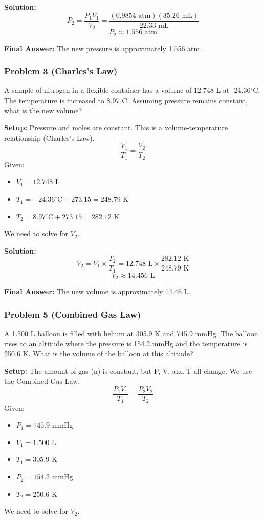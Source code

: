 \documentclass{article}
\begin{document}
\textbf{Solution:}
\[ P_2 = \frac{P_1V_1}{V_2} = \frac{(0.9854 \text{ atm})(35.26 \text{ mL})}{22.33 \text{ mL}} \]
\[ P_2 \approx 1.556 \text{ atm} \]

\textbf{Final Answer:} The new pressure is approximately 1.556 atm.

\subsubsection{Problem 3 (Charles's Law)}
A sample of nitrogen in a flexible container has a volume of 12.748 L at -24.36$^{\circ}$C. The temperature is increased to 8.97$^{\circ}$C. Assuming pressure remains constant, what is the new volume?

\textbf{Setup:}
Pressure and moles are constant. This is a volume-temperature relationship (Charles's Law).
\[ \frac{V_1}{T_1} = \frac{V_2}{T_2} \]
Given:
\begin{itemize}
    \item $V_1 = 12.748$ L
    \item $T_1 = -24.36^{\circ}\text{C} + 273.15 = 248.79$ K
    \item $T_2 = 8.97^{\circ}\text{C} + 273.15 = 282.12$ K
\end{itemize}
We need to solve for $V_2$.

\textbf{Solution:}
\[ V_2 = V_1 \times \frac{T_2}{T_1} = 12.748 \text{ L} \times \frac{282.12 \text{ K}}{248.79 \text{ K}} \]
\[ V_2 \approx 14.456 \text{ L} \]

\textbf{Final Answer:} The new volume is approximately 14.46 L.

\subsubsection{Problem 5 (Combined Gas Law)}
A 1.500 L balloon is filled with helium at 305.9 K and 745.9 mmHg. The balloon rises to an altitude where the pressure is 154.2 mmHg and the temperature is 250.6 K. What is the volume of the balloon at this altitude?

\textbf{Setup:}
The amount of gas (n) is constant, but P, V, and T all change. We use the Combined Gas Law.
\[ \frac{P_1V_1}{T_1} = \frac{P_2V_2}{T_2} \]
Given:
\begin{itemize}
    \item $P_1 = 745.9$ mmHg
    \item $V_1 = 1.500$ L
    \item $T_1 = 305.9$ K
    \item $P_2 = 154.2$ mmHg
    \item $T_2 = 250.6$ K
\end{itemize}
We need to solve for $V_2$.
\end{document}
